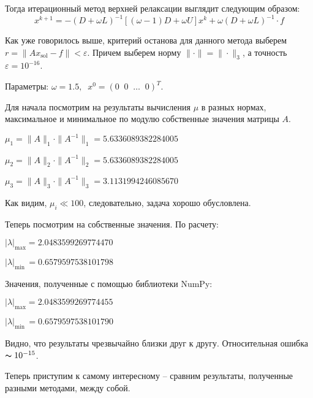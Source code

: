 		Тогда итерационный метод верхней релаксации выглядит следующим образом:
		\begin{equation*}
			x^{k+1} = -\left(D + \omega L\right)^{-1}\left[(\omega - 1)D + \omega U\right]x^k + \omega\left(D + \omega L\right)^{-1} \cdot f
		\end{equation*}
		
		
		Как уже говорилось выше, критерий останова для данного метода выберем $r = \|Ax_\text{sol} - f\| < \varepsilon$. Причем выберем норму $\| \cdot \| = \| \cdot \|_3$, а точность $\varepsilon = 10^{-16}$.
		
		Параметры: $\omega = 1.5, \;\; x^0 = (0 \;\; 0 \;\; \ldots \;\; 0)^T$.
		
		
		
		\newpage
		Для начала посмотрим на результаты вычисления $\mu$ в разных нормах, максимальное и минимальное по модулю собственные значения матрицы $A$.
		
		$\mu_1 = \|A\|_1 \cdot \|A^{-1}\|_1 = 5.6336089382284005$ 
		
		$\mu_2 = \|A\|_2 \cdot \|A^{-1}\|_2 = 5.6336089382284005$ 
		
		$\mu_3 = \|A\|_3 \cdot \|A^{-1}\|_3 = 3.1131994246085670$ 
		
		\noindent Как видим, $\mu_i \ll 100$, следовательно, задача хорошо обусловлена.
		
		Теперь посмотрим на собственные значения. По расчету:
		
		$|\lambda|_\text{max} = 2.0483599269774470$
		
		$|\lambda|_\text{min} \, = 0.6579597538101798$
		
		\noindent Значения, полученные с помощью библиотеки NumPy:
		
		$|\lambda|_\text{max} = 2.0483599269774455$
		
		$|\lambda|_\text{min} \, = 0.6579597538101790$
		
		\noindent Видно, что результаты чрезвычайно близки друг к другу. Относительная ошибка $\thicksim 10^{-15}$.
		
		
		Теперь приступим к самому интересному -- сравним результаты, полученные разными методами, между собой.
		
			
		
	
		
